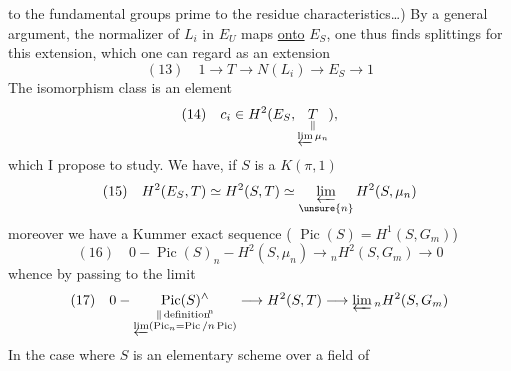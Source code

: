 to the fundamental groups prime to the residue characteristics\dots) By a general argument, the normalizer of $L_i$ in $E_U$ maps \uline{onto} $E_S$, one thus finds splittings for this extension, which one can regard as an extension
\[
(13)\quad 1\longrightarrow T\longrightarrow N(L_i)\longrightarrow E_S\longrightarrow1
\]
The isomorphism class is an element 
\[
(14)\quad c_i\in H^2(E_S,\underset{\substack{\Vert\\\varprojlim\mu_n}}{T}),
\]
which I propose to study. We have, if $S$ is a $K(\pi,1)$
\[
(15)\quad H^2(E_S,T)\simeq H^2(S,T)\simeq\varprojlim_{\unsure{n}} H^2(S,\mu_n)
\]
moreover we have a Kummer exact sequence ( $\operatorname{Pic}(S)=H^1(S,G_m)$)
\[
(16)\quad 0-\operatorname{Pic}(S)_n-H^2(S,\mu_n)\longrightarrow {}_nH^2(S,G_m)\longrightarrow0
\]
whence by passing to the limit
\[
(17)\quad 0-
\underset{\substack{\Vert\,\text{definition}\!^{\mathrm n}\\\varprojlim(\operatorname{Pic}_n=\operatorname{Pic}/n\operatorname{Pic})}}{\operatorname{Pic}(S)^\wedge}
\longrightarrow H^2(S,T)\longrightarrow\varprojlim {}_nH^2(S,G_m)
\]
In the case where $S$ is an elementary scheme over a field of  
